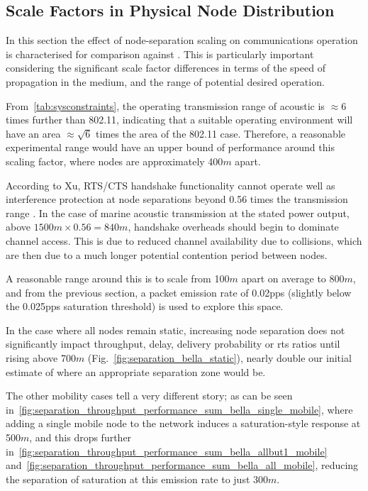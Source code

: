 \clearpage

\subsection{Scale Factors in Physical Node Distribution}

In this section the effect of node-separation scaling on communications operation is characterised for comparison against \cite{Guo11}. 
This is particularly important considering the significant scale factor differences in terms of the speed of propagation in the medium, and the range of potential desired operation.

From~\autoref{tab:sysconstraints}, the operating transmission range of acoustic is $\approx 6$ times further than 802.11, indicating that a suitable operating environment will have an area $\approx \sqrt{6}$ times the area of the 802.11 case. Therefore, a reasonable experimental range would have an upper bound of performance around this scaling factor, where nodes are approximately 400$m$ apart. 

According to Xu, RTS/CTS handshake functionality cannot operate well as interference protection at node separations beyond 0.56 times the transmission range \cite{Xu2002}.
In the case of marine acoustic transmission at the stated power output, above $1500m \times 0.56 = 840m$, handshake overheads should begin to dominate channel access.
This is due to reduced channel availability due to collisions, which are then due to a much longer potential contention period between nodes. 

A reasonable range around this is to scale from 100$m$ apart on average to 800$m$, and from the previous section, a packet emission rate of 0.02pps (slightly below the 0.025pps saturation threshold) is used to explore this space.

In the case where all nodes remain static, increasing node separation does not significantly impact throughput, delay, delivery probability or \gls{rts} ratios until rising above 700$m$ (Fig.~\ref{fig:separation_bella_static}), nearly double our initial estimate of where an appropriate separation zone would be.

The other mobility cases tell a very different story; as can be seen in~\autoref{fig:separation_throughput_performance_sum_bella_single_mobile}, where adding a single mobile node to the network induces a saturation-style response at 500$m$, and this drops further in~\autoref{fig:separation_throughput_performance_sum_bella_allbut1_mobile} and~\autoref{fig:separation_throughput_performance_sum_bella_all_mobile}, reducing the separation of saturation at this emission rate to just 300$m$.

